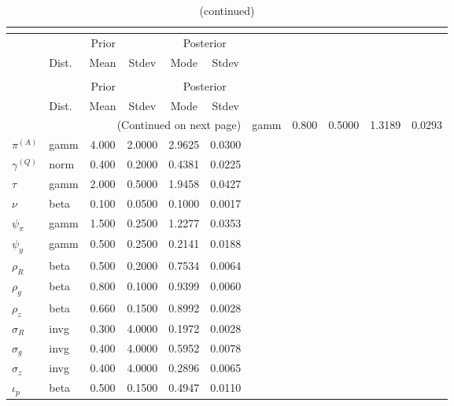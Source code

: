  
\begin{center}
\begin{longtable}{llcccc} 
\caption{Results from posterior maximization (parameters)}\\
 \label{Table:Posterior:1}\\
\toprule 
  & \multicolumn{3}{c}{Prior}  &  \multicolumn{2}{c}{Posterior} \\
  \cmidrule(r{.75em}){2-4} \cmidrule(r{.75em}){5-6}
  & Dist. & Mean  & Stdev & Mode & Stdev \\ 
\midrule \endfirsthead 
\caption{(continued)}\\
 \bottomrule 
  & \multicolumn{3}{c}{Prior}  &  \multicolumn{2}{c}{Posterior} \\
  \cmidrule(r{.75em}){2-4} \cmidrule(r{.75em}){5-6}
  & Dist. & Mean  & Stdev & Mode & Stdev \\ 
\midrule \endhead 
\bottomrule \multicolumn{6}{r}{(Continued on next page)}\endfoot 
\bottomrule\endlastfoot 
${r_{A}}$ & gamm &   0.800 & 0.5000 &   1.3189 &  0.0293 \\ 
${\pi^{(A)}}$ & gamm &   4.000 & 2.0000 &   2.9625 &  0.0300 \\ 
${\gamma^{(Q)}}$ & norm &   0.400 & 0.2000 &   0.4381 &  0.0225 \\ 
${\tau}$ & gamm &   2.000 & 0.5000 &   1.9458 &  0.0427 \\ 
${\nu}$ & beta &   0.100 & 0.0500 &   0.1000 &  0.0017 \\ 
${\psi_\pi}$ & gamm &   1.500 & 0.2500 &   1.2277 &  0.0353 \\ 
${\psi_y}$ & gamm &   0.500 & 0.2500 &   0.2141 &  0.0188 \\ 
${\rho_R}$ & beta &   0.500 & 0.2000 &   0.7534 &  0.0064 \\ 
${\rho_{g}}$ & beta &   0.800 & 0.1000 &   0.9399 &  0.0060 \\ 
${\rho_z}$ & beta &   0.660 & 0.1500 &   0.8992 &  0.0028 \\ 
${\sigma_R}$ & invg &   0.300 & 4.0000 &   0.1972 &  0.0028 \\ 
${\sigma_{g}}$ & invg &   0.400 & 4.0000 &   0.5952 &  0.0078 \\ 
${\sigma_z}$ & invg &   0.400 & 4.0000 &   0.2896 &  0.0065 \\ 
${\iota_p}$ & beta &   0.500 & 0.1500 &   0.4947 &  0.0110 \\ 
\end{longtable}
 \end{center}
